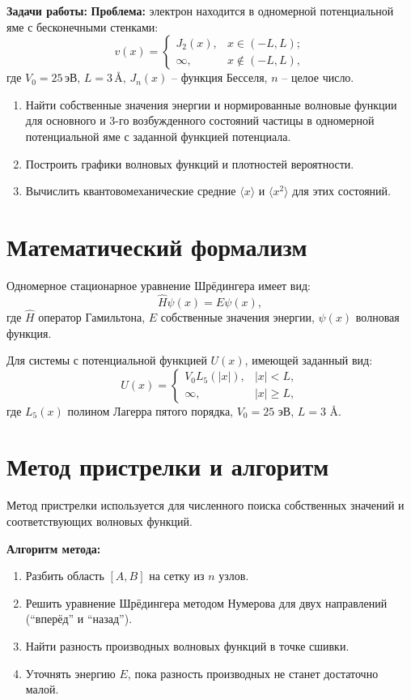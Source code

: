 \documentclass[a4paper, 12pt]{article}
\begin{document}
\textbf{Задачи работы:}
\textbf{Проблема:} электрон находится в одномерной потенциальной яме с бесконечными стенками:
\[
v(x) =
\begin{cases}
J_2(x), & x \in (-L, L); \\
\infty, & x \notin (-L, L),
\end{cases}
\]
где \( V_0 = 25 \, \text{эВ}, \, L = 3 \, \text{\AA}, \, J_n(x) \) -- функция Бесселя, \( n \) -- целое число.

\begin{enumerate}
    \item Найти собственные значения энергии и нормированные волновые функции для основного и 3-го возбужденного состояний частицы в одномерной потенциальной яме с заданной функцией потенциала.
    \item Построить графики волновых функций и плотностей вероятности.
    \item Вычислить квантовомеханические средние $\langle x \rangle$ и $\langle x^2 \rangle$ для этих состояний.
\end{enumerate}

\section{Математический формализм}
Одномерное стационарное уравнение Шрёдингера имеет вид:
\begin{equation}
    \hat{H}\psi(x) = E\psi(x),
\end{equation}
где $\hat{H}$ \textendash{} оператор Гамильтона, $E$ \textendash{} собственные значения энергии, $\psi(x)$ \textendash{} волновая функция.

Для системы с потенциальной функцией \( U(x) \), имеющей заданный вид:
\begin{equation}
U(x) = \begin{cases} V_0 L_5(|x|), & |x| < L, \\ \infty, & |x| \geq L, \end{cases}
\end{equation}
где $L_5(x)$ \textendash{} полином Лагерра пятого порядка, $V_0 = 25$ эВ, $L = 3$ \AA.

\section{Метод пристрелки и алгоритм}
Метод пристрелки используется для численного поиска собственных значений и соответствующих волновых функций.

\textbf{Алгоритм метода:}
\begin{enumerate}
    \item Разбить область $[A, B]$ на сетку из $n$ узлов.
    \item Решить уравнение Шрёдингера методом Нумерова для двух направлений (``вперёд'' и ``назад'').
    \item Найти разность производных волновых функций в точке сшивки.
    \item Уточнять энергию $E$, пока разность производных не станет достаточно малой.
\end{enumerate}
\end{document}
